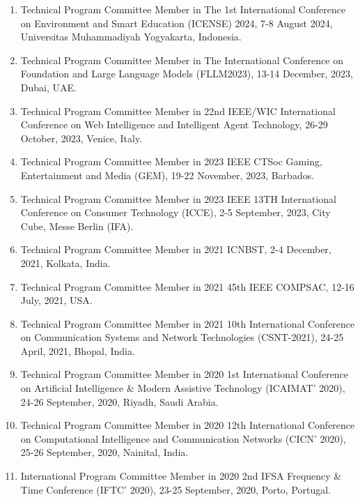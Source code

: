 \documentclass[11pt,a4paper]{moderncv}
\begin{document}
\begin{adjustwidth}{6em}{0pt}
\begin{enumerate}
		\item Technical Program Committee Member in The 1st International Conference on Environment and Smart Education (ICENSE) 2024, 7-8 August 2024, Universitas Muhammadiyah Yogyakarta, Indonesia.
		
		\item Technical Program Committee Member in The International Conference on Foundation and Large Language Models (FLLM2023), 13-14 December, 2023, Dubai, UAE.
		
		\item Technical Program Committee Member in 22nd IEEE/WIC International Conference on Web Intelligence and Intelligent Agent Technology, 26-29 October, 2023, Venice, Italy.
		
		\item Technical Program Committee Member in 2023 IEEE CTSoc Gaming, Entertainment and Media (GEM), 19-22 November, 2023, Barbados.
		
		\item Technical Program Committee Member in 2023 IEEE 13TH International Conference on Consumer Technology (ICCE), 2-5 September, 2023, City Cube, Messe Berlin (IFA).
		
		\item Technical Program Committee Member in 2021 ICNBST, 2-4 December, 2021, Kolkata, India.
		
		\item Technical Program Committee Member in 2021 45th IEEE COMPSAC, 12-16 July, 2021, USA.
		
		\item Technical Program Committee Member in 2021 10th International Conference on Communication Systems and Network Technologies (CSNT-2021), 24-25 April, 2021, Bhopal, India.
		
		\item Technical Program Committee Member in 2020 1st International Conference on Artificial Intelligence \& Modern Assistive Technology (ICAIMAT’ 2020), 24-26 September, 2020, Riyadh, Saudi Arabia.
		
		\item Technical Program Committee Member in 2020 12th International Conference on Computational Intelligence and Communication Networks (CICN' 2020), 25-26 September, 2020, Nainital, India.
		
		\item International Program Committee Member in 2020 2nd IFSA Frequency \& Time Conference (IFTC' 2020), 23-25 September, 2020, Porto, Portugal.
		

\end{enumerate}
\end{adjustwidth}
\end{document}
